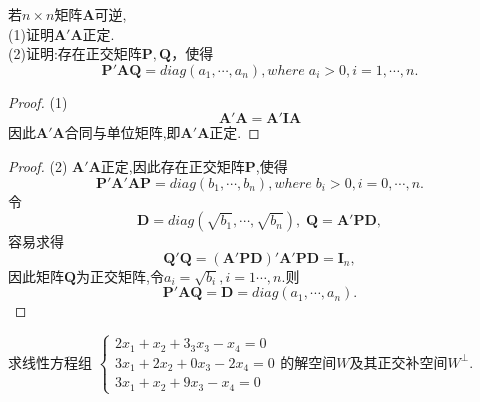 \documentclass[lang=cn,11pt,normal]{elegantbook}
\begin{document}
	\begin{exercise}
		若$n\times n$矩阵$\boldsymbol{A}$可逆,\\
		(1)证明$\boldsymbol{A}'\boldsymbol{A}$正定.\\
		(2)证明:存在正交矩阵$\boldsymbol{P},\boldsymbol{Q}$，使得
		$$
		\boldsymbol{P}'\boldsymbol{AQ}=diag(a_1,\cdots,a_n),where \; a_i>0,i=1,\cdots,n.
		$$
	\end{exercise}
	\begin{proof}
		(1)
		$$
		\boldsymbol{A}'\boldsymbol{A}=\boldsymbol{A}'\boldsymbol{IA}
		$$
		因此$\boldsymbol{A}'\boldsymbol{A}$合同与单位矩阵,即$\boldsymbol{A}'\boldsymbol{A}$正定.
	\end{proof}
	\begin{proof}
		(2)
		$\boldsymbol{A}'\boldsymbol{A}$正定,因此存在正交矩阵$\boldsymbol{P}$,使得
		$$
		\boldsymbol{P}'\boldsymbol{A}'\boldsymbol{AP}=diag(b_1,\cdots,b_n),where\;b_i>0,i=0,\cdots,n.
		$$
		令
		$$
		\boldsymbol{D}=diag(\sqrt{b_1},\cdots,\sqrt{b_n}),\;\boldsymbol{Q}=\boldsymbol{A}'\boldsymbol{PD},
		$$
		容易求得
		$$
		\boldsymbol{Q}'\boldsymbol{Q}=(\boldsymbol{A}'\boldsymbol{PD})'\boldsymbol{A}'\boldsymbol{PD}=\boldsymbol{I}_n,
		$$
		因此矩阵$\boldsymbol{Q}$为正交矩阵,令$a_i=\sqrt{b_i},i=1\cdots,n.$则
		$$
		\boldsymbol{P}'\boldsymbol{AQ}=\boldsymbol{D}=diag(a_1,\cdots,a_n).
		$$
	\end{proof}
	\begin{exercise}
		求线性方程组
		$
		\begin{cases}
		2x_1+x_2+3_3x_3-x_4=0\\
		3x_1+2x_2+0x_3-2x_4=0\\
		3x_1+x_2+9x_3-x_4=0
		\end{cases}
		$的解空间$W$及其正交补空间$W^{\perp}$.
	\end{exercise}
\end{document}

